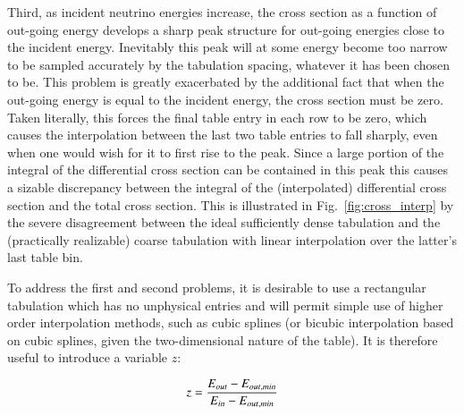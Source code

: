 \documentclass[3p,12pt]{elsarticle}
\begin{document}
Third, as incident neutrino energies increase, the cross section as a function of out-going energy develops a sharp peak structure for out-going energies close to the incident energy. 
Inevitably this peak will at some energy become too narrow to be sampled accurately by the tabulation spacing, whatever it has been chosen to be. 
This problem is greatly exacerbated by the additional fact that when the out-going energy is equal to the incident energy, the cross section must be zero. 
Taken literally, this forces the final table entry in each row to be zero, which causes the interpolation between the last two table entries to fall sharply, even when one would wish for it to first rise to the peak. 
Since a large portion of the integral of the differential cross section can be contained in this peak this causes a sizable discrepancy between the integral of the (interpolated) differential cross section and the total cross section. 
This is illustrated in Fig.~\ref{fig:cross_interp} by the severe disagreement between the ideal sufficiently dense tabulation and the (practically realizable) coarse tabulation with linear interpolation over the latter's last table bin. 

To address the first and second problems, it is desirable to use a rectangular tabulation which has no unphysical entries and will permit simple use of higher order interpolation methods, such as cubic splines (or bicubic interpolation based on cubic splines, given the two-dimensional nature of the table). 
It is therefore useful to introduce a variable $z$:

\begin{equation}
  z = {E_{out} - E_{out,min} \over E_{in} - E_{out,min}}
\end{equation}
\end{document}

